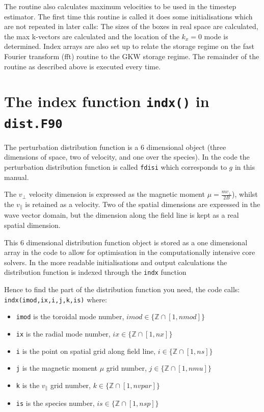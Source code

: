 \documentclass{report}
\begin{document}
\par
The routine also calculates maximum velocities to be used in the timestep estimator.  The first time this routine is called it does some initialisations which are not repeated in later calls:  The sizes of the boxes in real space are calculated, the max k-vectors are calculated and the location of the $k_x = 0$ mode is determined.  Index arrays are also set up to relate the storage regime on the fast Fourier transform (fft) routine to the GKW storage regime. The remainder of the routine as described above is executed every time.

\section{The index function \texttt{indx()} in \texttt{dist.F90}}%
The perturbation distribution function is a 6 dimensional object (three dimensions of space, two of velocity, and one over the species). In the code the perturbation distribution function is called \texttt{fdisi} which corresponds to $g$ in this manual.

The $v_\perp$ velocity dimension is expressed as the magnetic moment $\mu = \frac{mv_\perp}{2B}$), whilst the $v_\parallel$ is retained as a velocity. Two of the spatial dimensions are expressed in the wave vector domain, but the dimension along the field line is kept as a real spatial dimension.

This 6 dimensional distribution function object is stored as a one dimensional array in the code to allow for optimisation in the computationally intensive core solvers.  In the more readable initialisations and output calculations  the distribution function is indexed through the \texttt{indx} function 

Hence to find the part of the distribution function you need, the code calls: \texttt{indx(imod,ix,i,j,k,is)} where: 

\begin{itemize}
 \item \texttt{imod} is the toroidal mode number, $ imod \in \lbrace\mathbb{Z}\cap[1,nmod]\rbrace$
 \item \texttt{ix} is the radial mode number, $ ix \in \lbrace\mathbb{Z}\cap[1,nx]\rbrace$
 \item \texttt{i} is the point on spatial grid along field line, $ i \in \lbrace\mathbb{Z}\cap[1,ns]\rbrace$
 \item \texttt{j} is the magnetic moment $\mu$ grid number, $ j \in \lbrace\mathbb{Z}\cap[1,nmu]\rbrace$  
 \item \texttt{k} is the $v_\parallel$ grid number, $ k \in \lbrace\mathbb{Z}\cap[1,nvpar]\rbrace$
 \item \texttt{is} is the species number, $ is \in \lbrace\mathbb{Z}\cap[1,nsp]\rbrace$

\end{itemize}
\end{document}
